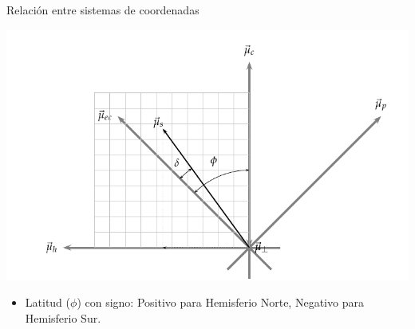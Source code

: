 \documentclass[xcolor={usenames,svgnames,dvipsnames}]{beamer}
\begin{document}
\begin{frame}[label={sec:org0e8a110}]{Relación entre sistemas de coordenadas}
\begin{center}
\includegraphics[width=.9\linewidth]{../figs/RelacionSistemasCoordenadas.pdf}
\end{center}

\begin{itemize}
\item \alert{Latitud (\(\phi\)) con signo}: Positivo para Hemisferio Norte, Negativo para Hemisferio Sur.
\end{itemize}
\end{frame}
\end{document}
